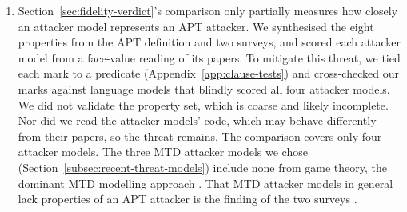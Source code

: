 \documentclass{cshonours}
\begin{document}
\begin{enumerate}[resume*=threats]
\item\label{thr:yardstick} Section~\ref{sec:fidelity-verdict}'s comparison
only partially measures how closely an attacker model represents an APT
attacker. We synthesised the eight properties from the APT definition and two
surveys, and scored each attacker model from a face-value reading of its
papers. To mitigate this threat, we tied each mark to a predicate
(Appendix~\ref{app:clause-tests}) and cross-checked our marks against language
models that blindly scored all four attacker models. We did not validate the
property set, which is coarse and likely incomplete. Nor did we read the
attacker models' code, which may behave differently from their papers, so the
threat remains. The comparison covers only four attacker models. The three MTD
attacker models we chose (Section~\ref{subsec:recent-threat-models}) include
none from game theory, the dominant MTD modelling approach \citep{cho2020}.
That MTD attacker models in general lack properties of an APT attacker is
the finding of the two surveys \citep{cho2020, jalowski2026}.
\end{enumerate}
\end{document}
